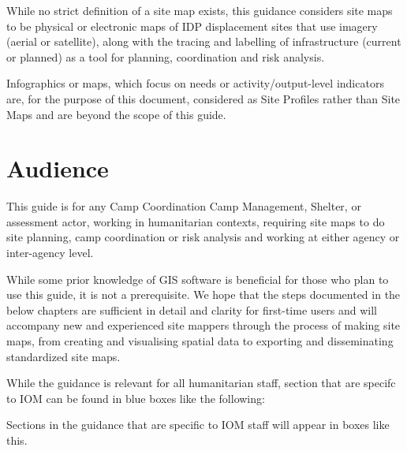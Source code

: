 \documentclass[
  a4paper,
  onecolumn,
  oneside]{book}
\begin{document}
While no strict definition of a site map exists, this guidance considers
site maps to be physical or electronic maps of IDP displacement sites
that use imagery (aerial or satellite), along with the tracing and
labelling of infrastructure (current or planned) as a tool for planning,
coordination and risk analysis.

\begin{tcolorbox}[enhanced jigsaw, opacitybacktitle=0.6, colbacktitle=quarto-callout-note-color!10!white, breakable, coltitle=black, title=\textcolor{quarto-callout-note-color}{\faInfo}\hspace{0.5em}{Note}, toprule=.15mm, bottomrule=.15mm, colback=white, left=2mm, toptitle=1mm, bottomtitle=1mm, arc=.35mm, colframe=quarto-callout-note-color-frame, titlerule=0mm, opacityback=0, rightrule=.15mm, leftrule=.75mm]

Infographics or maps, which focus on needs or activity/output-level
indicators are, for the purpose of this document, considered as Site
Profiles rather than Site Maps and are beyond the scope of this guide.

\end{tcolorbox}

\hypertarget{audience}{%
\section*{Audience}\label{audience}}


This guide is for any Camp Coordination Camp Management, Shelter, or
assessment actor, working in humanitarian contexts, requiring site maps
to do site planning, camp coordination or risk analysis and working at
either agency or inter-agency level.

While some prior knowledge of GIS software is beneficial for those who
plan to use this guide, it is not a prerequisite. We hope that the steps
documented in the below chapters are sufficient in detail and clarity
for first-time users and will accompany new and experienced site mappers
through the process of making site maps, from creating and visualising
spatial data to exporting and disseminating standardized site maps.

While the guidance is relevant for all humanitarian staff, section that
are specifc to IOM can be found in blue boxes like the following:

\begin{tcolorbox}[enhanced jigsaw, opacitybacktitle=0.6, colbacktitle=quarto-callout-note-color!10!white, breakable, coltitle=black, title=\textcolor{quarto-callout-note-color}{\faInfo}\hspace{0.5em}{Note for IOM staff}, toprule=.15mm, bottomrule=.15mm, colback=white, left=2mm, toptitle=1mm, bottomtitle=1mm, arc=.35mm, colframe=quarto-callout-note-color-frame, titlerule=0mm, opacityback=0, rightrule=.15mm, leftrule=.75mm]

Sections in the guidance that are specific to IOM staff will appear in
boxes like this.

\end{tcolorbox}
\end{document}
